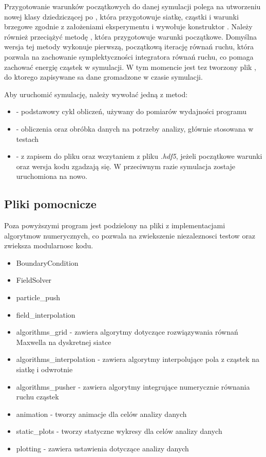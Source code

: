 Przygotowanie warunków początkowych do danej symulacji polega na utworzeniu
nowej klasy dziedziczącej po , która przygotowuje siatkę,
cząstki i warunki brzegowe zgodnie z założeniami eksperymentu i wywołuje
konstruktor .  Należy również przeciążyć metodę
, która przygotowuje warunki początkowe. Domyślna
wersja tej metody wykonuje pierwszą, początkową iterację równań ruchu,
która pozwala na zachowanie symplektyczności integratora równań ruchu,
 co pomaga zachować energię cząstek w symulacji.
W tym momencie jest tez tworzony plik , do ktorego zapisywane sa
dane gromadzone w czasie symulacji.

Aby uruchomić symulację, należy wywołać jedną z metod:
\begin{itemize}
     \item {} - podstawowy cykl obliczeń, używany do pomiarów
         wydajności programu
     \item {} - obliczenia oraz obróbka danych na potrzeby
         analizy, głównie stosowana w testach
     \item {} -  z zapisem do pliku oraz
         wczytaniem z pliku \emph{.hdf5}, jeżeli początkowe warunki oraz
         wersja kodu zgadzają się. W przeciwnym razie symulacja zostaje
         uruchomiona na nowo.
\end{itemize}

\subsection{Pliki pomocnicze}
Poza powyższymi program jest podzielony na pliki z implementacjami algorytmow numerycznych,
co pozwala na zwiekszenie niezaleznosci testow oraz zwieksza modularnosc kodu.
\begin{itemize}
    \item BoundaryCondition
    \item FieldSolver
    \item particle\_push
    \item field\_interpolation

    \item algorithms\_grid - zawiera algorytmy dotyczące rozwiązywania
        równań Maxwella na dyskretnej siatce

    \item algorithms\_interpolation - zawiera algorytmy interpolujące pola
        z cząstek na siatkę i odwrotnie
    \item algorithms\_pusher - zawiera algorytmy integrujące numerycznie
        równania ruchu cząstek
    \item animation - tworzy animacje dla celów analizy danych
    \item static\_plots - tworzy statyczne wykresy dla celów analizy danych
    \item plotting - zawiera ustawienia dotyczące analizy danych
\end{itemize}


